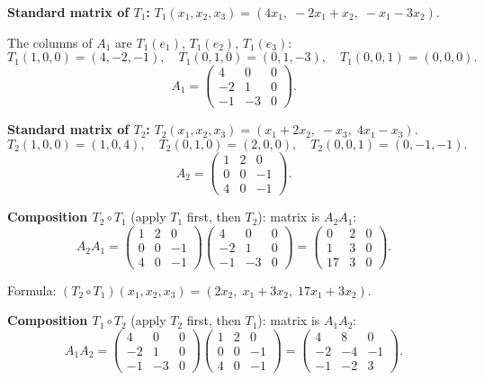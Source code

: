 \documentclass[12pt,a3paper]{article}
\begin{document}
\begin{tcolorbox}[enhanced,breakable,
  colback=cF!4,colframe=cF,boxrule=0.8pt,arc=5pt,
  title={\textbf{Answer --- Standard Matrices of $T_1$, $T_2$; Compositions $T_2\circ T_1$ and $T_1\circ T_2$}},
  fonttitle=\bfseries\color{white},colbacktitle=cF]

\textbf{Standard matrix of $T_1$:}
$T_1(x_1,x_2,x_3)=(4x_1,\;-2x_1+x_2,\;-x_1-3x_2)$.

The columns of $A_1$ are $T_1(e_1)$, $T_1(e_2)$, $T_1(e_3)$:
\[
T_1(1,0,0)=(4,-2,-1),\quad T_1(0,1,0)=(0,1,-3),\quad T_1(0,0,1)=(0,0,0).
\]
\[
A_1=\begin{pmatrix}4&0&0\\-2&1&0\\-1&-3&0\end{pmatrix}.
\]

\textbf{Standard matrix of $T_2$:}
$T_2(x_1,x_2,x_3)=(x_1+2x_2,\;-x_3,\;4x_1-x_3)$.
\[
T_2(1,0,0)=(1,0,4),\quad T_2(0,1,0)=(2,0,0),\quad T_2(0,0,1)=(0,-1,-1).
\]
\[
A_2=\begin{pmatrix}1&2&0\\0&0&-1\\4&0&-1\end{pmatrix}.
\]

\textbf{Composition $T_2\circ T_1$} (apply $T_1$ first, then $T_2$): matrix is $A_2A_1$:
\[
A_2A_1=\begin{pmatrix}1&2&0\\0&0&-1\\4&0&-1\end{pmatrix}\begin{pmatrix}4&0&0\\-2&1&0\\-1&-3&0\end{pmatrix}=\begin{pmatrix}0&2&0\\1&3&0\\17&3&0\end{pmatrix}.
\]

Formula: $(T_2\circ T_1)(x_1,x_2,x_3)=(2x_2,\;x_1+3x_2,\;17x_1+3x_2)$.

\textbf{Composition $T_1\circ T_2$} (apply $T_2$ first, then $T_1$): matrix is $A_1A_2$:
\[
A_1A_2=\begin{pmatrix}4&0&0\\-2&1&0\\-1&-3&0\end{pmatrix}\begin{pmatrix}1&2&0\\0&0&-1\\4&0&-1\end{pmatrix}=\begin{pmatrix}4&8&0\\-2&-4&-1\\-1&-2&3\end{pmatrix}.
\]


\end{tcolorbox}
\end{document}
